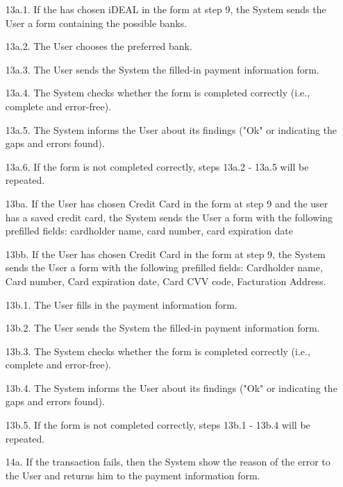 \begin{enumerate}
    \item[13a.1.] If the has chosen iDEAL in the form at step 9, the System sends the User a form containing the possible banks.
    \item[13a.2.] The User chooses the preferred bank.
    \item[13a.3.] The User sends the System the filled-in payment information form.
    \item[13a.4.] The System checks whether the form is completed correctly (i.e., complete and error-free).
    \item[13a.5.] The System informs the User about its findings ("Ok" or indicating the gaps and errors found).
    \item[13a.6.] If the form is not completed correctly, steps 13a.2 - 13a.5 will be repeated.
    \item[] \phantom{x}
    
    \item[13ba.] If the User has chosen Credit Card in the form at step 9 and the user has a saved credit card, the System sends the User a form with the following prefilled fields:  cardholder name, card number, card expiration date
    \item[13bb.] If the User has chosen Credit Card in the form at step 9, the System sends the User a form with the following prefilled fields: Cardholder name, Card number, Card expiration date, Card CVV code, Facturation Address.
    \item[] \phantom{x}
    
    \item[13b.1.] The User fills in the payment information form.
    \item[13b.2.] The User sends the System the filled-in payment information form.
    \item[13b.3.] The System checks whether the form is completed correctly (i.e., complete and error-free).
    \item[13b.4.] The System informs the User about its findings ("Ok" or indicating the gaps and errors found).
    \item[13b.5.] If the form is not completed correctly, steps 13b.1 - 13b.4 will be repeated.
    \item[] \phantom{x}
    
    \item[14a.] If the transaction fails, then the System show the reason of the error to the User and returns him to the payment information form.
\end{enumerate}

